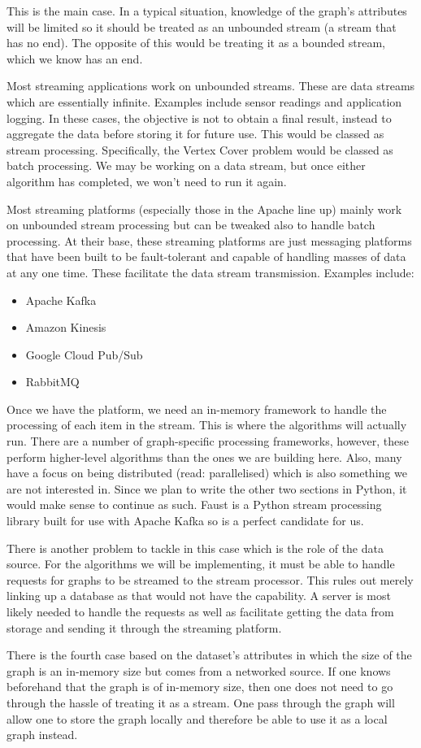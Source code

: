 This is the main case. In a typical situation, knowledge of the graph's
attributes will be limited so it should be treated as an unbounded stream (a
stream that has no end). The opposite of this would be treating it as a bounded
stream, which we know has an end.

Most streaming applications work on unbounded streams. These are data streams
which are essentially infinite. Examples include sensor readings and
application logging. In these cases, the objective is not to obtain a final
result, instead to aggregate the data before storing it for future use. This
would be classed as stream processing. Specifically, the Vertex Cover problem
would be classed as batch processing. We may be working on a data stream, but
once either algorithm has completed, we won't need to run it again.

Most streaming platforms (especially those in the Apache line up) mainly work
on unbounded stream processing but can be tweaked also to handle batch
processing. At their base, these streaming platforms are just messaging
platforms that have been built to be fault-tolerant and capable of handling
masses of data at any one time. These facilitate the data stream transmission.
Examples include:

\begin{itemize}
    \item
          Apache Kafka
    \item
          Amazon Kinesis
    \item
          Google Cloud Pub/Sub
    \item
          RabbitMQ
\end{itemize}

Once we have the platform, we need an in-memory framework to handle the
processing of each item in the stream. This is where the algorithms will
actually run. There are a number of graph-specific processing frameworks,
however, these perform higher-level algorithms than the ones we are building
here. Also, many have a focus on being distributed (read: parallelised) which
is also something we are not interested in. Since we plan to write the other
two sections in Python, it would make sense to continue as such. Faust is a
Python stream processing library built for use with Apache Kafka so is a
perfect candidate for us.

There is another problem to tackle in this case which is the role of the data
source. For the algorithms we will be implementing, it must be able to handle
requests for graphs to be streamed to the stream processor. This rules out
merely linking up a database as that would not have the capability. A server is
most likely needed to handle the requests as well as facilitate getting the
data from storage and sending it through the streaming platform.

There is the fourth case based on the dataset's attributes in which the size of
the graph is an in-memory size but comes from a networked source. If one knows
beforehand that the graph is of in-memory size, then one does not need to go
through the hassle of treating it as a stream. One pass through the graph will
allow one to store the graph locally and therefore be able to use it as a local
graph instead.
